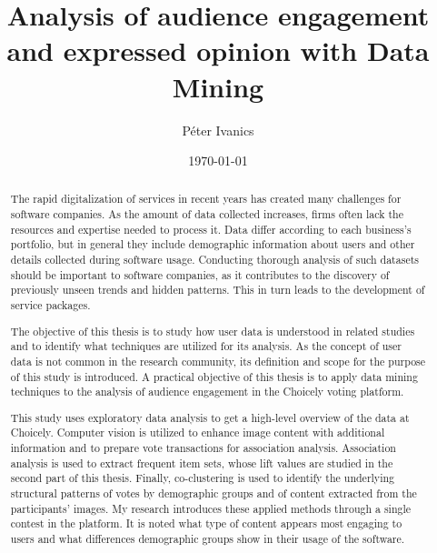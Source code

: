 \documentclass[english]{tktltiki}
\begin{document}
\onehalfspacing

\title{Analysis of audience engagement and expressed opinion with Data Mining}
\author{P\'eter Ivanics}

\date{\today}

\maketitle


\begin{abstract}
The rapid digitalization of services in recent years has created many challenges for software companies. As the amount of data collected increases, firms often lack the resources and expertise needed to process it. Data differ according to each business's portfolio, but in general they include demographic information about users and other details collected during software usage. Conducting thorough analysis of such datasets should be important to software companies, as it contributes to the discovery of previously unseen trends and hidden patterns. This in turn leads to the development of service packages. 

The objective of this thesis is to study how user data is understood in related studies and to identify what techniques are utilized for its analysis. As the concept of user data is not common in the research community, its definition and scope for the purpose of this study is introduced. A practical objective of this thesis is to apply data mining techniques to the analysis of audience engagement in the Choicely voting platform. 

This study uses exploratory data analysis to get a high-level overview of the data at Choicely. Computer vision is utilized to enhance image content with additional information and to prepare vote transactions for association analysis. Association analysis is used to extract frequent item sets, whose lift values are studied in the second part of this thesis. Finally, co-clustering is used to identify the underlying structural patterns of votes by demographic groups and of content extracted from the participants' images. My research introduces these applied methods through a single contest in the platform. It is noted what type of content appears most engaging to users and what differences demographic groups show in their usage of the software.


\end{abstract}
\end{document}
